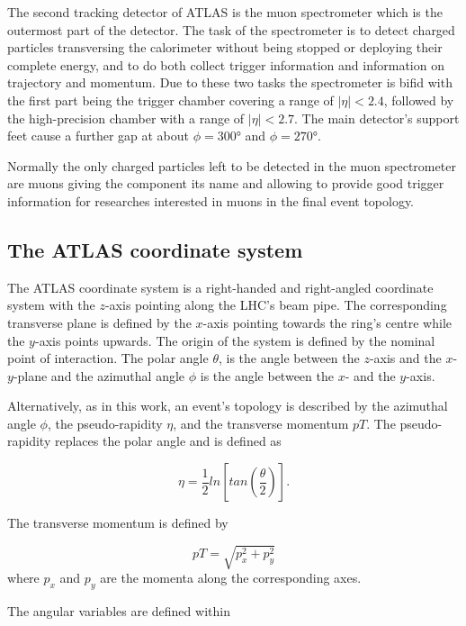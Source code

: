 The second tracking detector of ATLAS is the muon spectrometer which is the outermost part of the detector. The task of the spectrometer is to detect charged particles transversing the calorimeter without being stopped or deploying their complete energy, and to do both collect trigger information and information on trajectory and momentum. Due to these two tasks the spectrometer is bifid with the first part being the trigger chamber covering a range of $|\eta|<2.4$, followed by the high-precision chamber with a range of $|\eta|<2.7$. The main detector's support feet cause a further gap at about $\phi = \ang{300}$ and $\phi = \ang{270}$.

Normally the only charged particles left to be detected in the muon spectrometer are muons giving the component its name and allowing to provide good trigger information for researches interested in muons in the final event topology.




\subsection{The ATLAS coordinate system}

The ATLAS coordinate system is a right-handed and right-angled coordinate system with the $z$-axis pointing along the LHC's beam pipe. The corresponding transverse plane is defined by the $x$-axis pointing towards the ring's centre while the $y$-axis points upwards. The origin of the system is defined by the nominal point of interaction. The polar angle $\theta$, is the angle between the $z$-axis and the $x$-$y$-plane and the azimuthal angle $\phi$ is the angle between the $x$- and the $y$-axis.

Alternatively, as in this work, an event's topology is described by the azimuthal angle $\phi$, the pseudo-rapidity $\eta$, and the transverse momentum $pT$. The pseudo-rapidity replaces the polar angle and is defined as

\begin{equation}
\eta = \frac{1}{2} ln\left[ tan\left(\frac{\theta}{2}\right)\right].
\end{equation}

The transverse momentum is defined by

\begin{equation}
pT = \sqrt{p_x^2 + p_y^2}
\end{equation}
where $p_x$ and $p_y$ are the momenta along the corresponding axes. 

The angular variables are defined within

